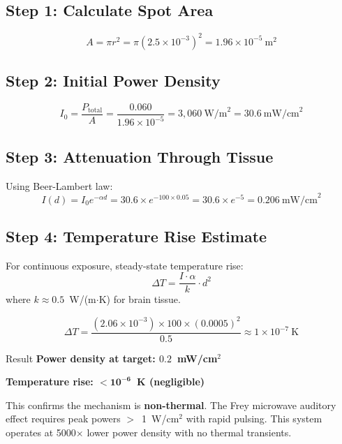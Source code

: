 \subsection*{Step 1: Calculate Spot Area}
\begin{equation}
A = \pi r^2 = \pi (2.5 \times 10^{-3})^2 = 1.96 \times 10^{-5}~\text{m}^2
\end{equation}

\subsection*{Step 2: Initial Power Density}
\begin{equation}
I_0 = \frac{P_{\text{total}}}{A} = \frac{0.060}{1.96 \times 10^{-5}} = 3{,}060~\text{W/m}^2 = 30.6~\text{mW/cm}^2
\end{equation}

\subsection*{Step 3: Attenuation Through Tissue}
Using Beer-Lambert law:
\begin{equation}
I(d) = I_0 e^{-\alpha d} = 30.6 \times e^{-100 \times 0.05} = 30.6 \times e^{-5} = 0.206~\text{mW/cm}^2
\end{equation}

\subsection*{Step 4: Temperature Rise Estimate}
For continuous exposure, steady-state temperature rise:
\begin{equation}
\Delta T = \frac{I \cdot \alpha}{k} \cdot d^2
\end{equation}
where $k \approx 0.5$~W/(m$\cdot$K) for brain tissue.

\begin{equation}
\Delta T = \frac{(2.06 \times 10^{-3}) \times 100 \times (0.0005)^2}{0.5} \approx 1 \times 10^{-7}~\text{K}
\end{equation}

\begin{calloutbox}[colback=black!5!white,colframe=black]{Result}
\textbf{Power density at target: $\mathbf{0.2}$~mW/cm$^2$}

\textbf{Temperature rise: $\mathbf{< 10^{-6}}$~K (negligible)}

This confirms the mechanism is \textbf{non-thermal}. The Frey microwave auditory effect requires peak powers $>$~1~W/cm$^2$ with rapid pulsing. This system operates at 5000$\times$ lower power density with no thermal transients.
\end{calloutbox}

